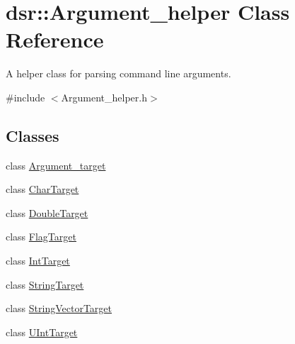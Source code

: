 \hypertarget{classdsr_1_1_argument__helper}{
\section{dsr::Argument\_\-helper Class Reference}
\label{classdsr_1_1_argument__helper}
}


A helper class for parsing command line arguments.  




{\ttfamily \#include $<$Argument\_\-helper.h$>$}

\subsection*{Classes}
\begin{DoxyCompactItemize}
\item 
class \hyperlink{classdsr_1_1_argument__helper_1_1_argument__target}{Argument\_\-target}
\item 
class \hyperlink{classdsr_1_1_argument__helper_1_1_char_target}{CharTarget}
\item 
class \hyperlink{classdsr_1_1_argument__helper_1_1_double_target}{DoubleTarget}
\item 
class \hyperlink{classdsr_1_1_argument__helper_1_1_flag_target}{FlagTarget}
\item 
class \hyperlink{classdsr_1_1_argument__helper_1_1_int_target}{IntTarget}
\item 
class \hyperlink{classdsr_1_1_argument__helper_1_1_string_target}{StringTarget}
\item 
class \hyperlink{classdsr_1_1_argument__helper_1_1_string_vector_target}{StringVectorTarget}
\item 
class \hyperlink{classdsr_1_1_argument__helper_1_1_u_int_target}{UIntTarget}
\end{DoxyCompactItemize}
